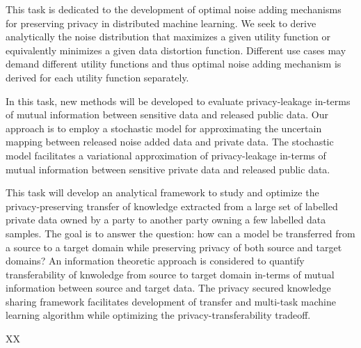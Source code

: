 \begin{Workpackage}{\thewpno}
\begin{Task}
 \TaskResults{%
 }
 \TaskHeader{}
 This task is dedicated to the development of optimal noise adding mechanisms for preserving privacy in distributed machine learning. We seek to derive analytically the noise distribution that maximizes a given utility function or equivalently minimizes a given data distortion function. Different use cases may demand different utility functions and thus optimal noise adding mechanism is derived for each utility function separately.  
\end{Task}
 
\begin{Task}
  
  \TaskResults{%
  }
  \TaskHeader{}
  In this task, new methods will be developed to evaluate privacy-leakage in-terms of mutual information between sensitive data and released public data. Our approach is to employ a stochastic model for approximating the uncertain mapping between released noise added data and private data. The stochastic model facilitates a variational approximation of privacy-leakage in-terms of mutual information between sensitive private data and released public data.   
 \end{Task}

 \begin{Task}
  
  \TaskResults{%
  }
  \TaskHeader{}
  This task will develop an analytical framework to study and optimize the privacy-preserving transfer of knowledge extracted from a large set of labelled private data owned by a party to another party owning a few labelled data samples. The goal is to answer the question: how can a model be transferred from a source to a target domain while preserving privacy of both source and target domains? An information theoretic approach is considered to quantify transferability of knwoledge from source to target domain in-terms of mutual information between source and target data. The privacy secured knowledge sharing framework facilitates development of transfer and multi-task machine learning algorithm while optimizing the privacy-transferability tradeoff.    
 \end{Task}

 

\begin{WPDeliverables}
  \begin{compactitem}
    \item XX
\end{compactitem}
\end{WPDeliverables}
\end{Workpackage}

